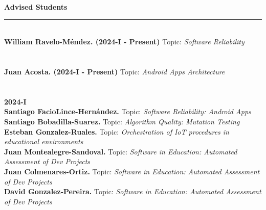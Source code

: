 \documentclass[letterpaper,11pt,oneside]{article}
\begin{document}
%
\newpage
\noindent \Large{\textbf{Advised Students} \\
\vspace{-2ex}
\hrule 
\normalsize
\vspace{2ex}
\\
\indent\textbf{William Ravelo-M\'endez. (2024-I - Present)} {\footnotesize Topic: \textit{Software Reliability}}\\\\
\\
\indent\textbf{Juan Acosta. (2024-I - Present)} {\footnotesize Topic: \textit{Android Apps Architecture}}\\\\
\\
\noindent\textbf{2024-I}\\
\indent\noindent\textbf{Santiago FacioLince-Hern\'andez.}  {\footnotesize Topic: \textit{Software Reliability: Android Apps}} \\
\indent\noindent\textbf{Santiago Bobadilla-Suarez.}  {\footnotesize Topic: \textit{Algorithm Quality: Mutation Testing}} \\
\indent\noindent\textbf{Esteban Gonzalez-Ruales.}  {\footnotesize Topic: \textit{Orchestration of IoT procedures in educational environments}} \\
\indent\noindent\textbf{Juan Montealegre-Sandoval.}  {\footnotesize Topic: \textit{Software in Education: Automated Assessment of Dev Projects}} \\
\indent\noindent\textbf{Juan Colmenares-Ortiz.}  {\footnotesize Topic: \textit{Software in Education: Automated Assessment of Dev Projects}} \\
\indent\noindent\textbf{David Gonzalez-Pereira.}  {\footnotesize Topic: \textit{Software in Education: Automated Assessment of Dev Projects}} \\
}
\end{document}
